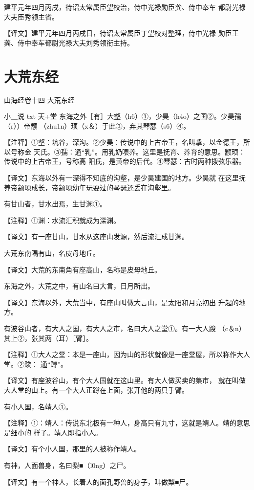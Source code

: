 \documentclass[a4paper,12pt,UTF8,twoside]{ctexbook}
\begin{document}
建平元年四月丙戌，待诏太常属臣望校治，侍中光禄勋臣龚、侍中奉车 都尉光禄大夫臣秀领主省。

【译文】建平元年四月丙戌日，待诏太常属臣丁望校对整理，侍中光禄 勋臣王龚、侍中奉车都尉光禄大夫刘秀领衔主持。

\chapter{大荒东经}

山海经卷十四 大荒东经

小＿说  txt 天+堂
东海之外［有］大壑（h6）①，少昊（h4o）之国②。少昊孺（r））帝颛 （zhu1n）顼（x＆）于此③，弃其琴瑟（s6）④。

【注释】①壑：坑谷，深沟。②少昊：传说中的上古帝王，名叫挚，以金德王，所以号称金 天氏。③孺：通“乳”。用乳奶喂养。这里是抚育、养育的意思。颛顼：传说中的上古帝王，号称高 阳氏，是黄帝的后代。④琴瑟：古时两种拨弦乐器。

【译文】东海以外有一深得不知底的沟壑，是少昊建国的地方。少昊就 在这里抚养帝颛顼成长，帝颛顼幼年玩耍过的琴瑟还丢在沟壑里。

有甘山者，甘水出焉，生甘渊①。

【注释】①渊：水流汇积就成为深渊。

【译文】有一座甘山，甘水从这座山发源，然后流汇成甘渊。

大荒东南隅有山，名皮母地丘。

【译文】大荒的东南角有座高山，名称是皮母地丘。

东海之外，大荒之中，有山名曰大言，日月所出。

【译文】东海以外，大荒当中，有座山叫做大言山，是太阳和月亮初出 升起的地方。

有波谷山者，有大人之国，有大人之市，名曰大人之堂①。有一大人踆 （c＆n）其上②，张其两（耳）［臂］。

【注释】①大人之堂：本是一座山，因为山的形状就像是一座堂屋，所以称作大人堂。②踆： 通“蹲”。

【译文】有座波谷山，有个大人国就在这山里。有大人做买卖的集市， 就在叫做大人堂的山上。有一个大人正蹲在上面，张开他的两只手臂。

有小人国，名靖人①。

【注释】①：靖人：传说东北极有一种人，身高只有九寸，这就是靖人。靖的意思是细小的 样子。靖人即指小人。

【译文】有个小人国，那里的人被称作靖人。

有神，人面兽身，名曰梨■（l0ng）之尸。

【译文】有一个神人，长着人的面孔野兽的身子，叫做梨■尸。
\end{document}
